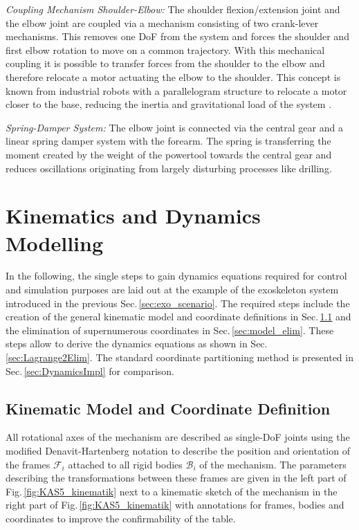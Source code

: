 \documentclass{svproc}
\newcommand{\body}[1]{{\mathcal{B}}_{#1}}
\newcommand{\ks}[1]{{\mathcal{F}}_{#1}}
\begin{document}
\emph{Coupling Mechanism Shoulder-Elbow:}
The shoulder flexion/extension joint and the elbow joint are coupled via a mechanism consisting of two crank-lever mechanisms.
This removes one DoF from the system and forces the shoulder and first elbow rotation to move on a common trajectory.
With this mechanical coupling it is possible to transfer forces from the shoulder to the elbow and therefore relocate a motor actuating the elbow to the shoulder.
This concept is known from industrial robots with a parallelogram structure to relocate a motor closer to the base, reducing the inertia and gravitational load of the system \cite{LuhZhe1985}.

\emph{Spring-Damper System:}
The elbow joint is connected via the central gear and a linear spring damper system with the forearm.
The spring is transferring the moment created by the weight of the powertool towards the central gear and reduces oscillations originating from largely disturbing processes like drilling.

\section{Kinematics and Dynamics Modelling}
\label{sec:model}

In the following, the single steps to gain dynamics equations required for control and simulation purposes are laid out at the example of the exoskeleton system introduced in the previous Sec.\,\ref{sec:exo_scenario}.
The required steps include the creation of the general kinematic model and coordinate definitions in Sec.\,\ref{sec:model_fullcoord} and the elimination of supernumerous coordinates in Sec.\,\ref{sec:model_elim}.
These steps allow to derive the dynamics equations as shown in Sec.\,\ref{sec:Lagrange2Elim}.
The standard coordinate partitioning method is presented in Sec.\,\ref{sec:DynamicsImpl} for comparison.

\subsection{Kinematic Model and Coordinate Definition}
\label{sec:model_fullcoord}

All rotational axes of the mechanism are described as single-DoF joints using the modified Denavit-Hartenberg notation \cite{KhalilBen1995} to describe the position and orientation of the frames $\ks{i}$ attached to all rigid bodies $\body{i}$ of the mechanism.
The parameters describing the transformations between these frames are given in the left part of Fig.\,\ref{fig:KAS5_kinematik} next to a kinematic sketch of the mechanism in the right part of Fig.\,\ref{fig:KAS5_kinematik} with annotations for frames, bodies and coordinates to improve the confirmability of the table.
\end{document}
